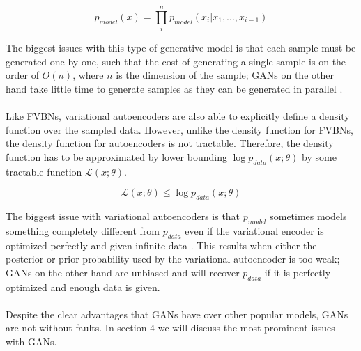 $$p_{model}(x) = \prod_i^np_{model}(x_i|x_1,...,x_{i-1})$$

The biggest issues with this type of generative model is that each sample must be generated one by one, such that the cost of generating a single sample is on the order of $O(n)$, where $n$ is the dimension of the sample; GANs on the other hand take little time to generate samples as they can be generated in parallel \cite{oord2016wavenet}. \\ \\
Like FVBNs, variational autoencoders are also able to explicitly define a density function over the sampled data. However, unlike the density function for FVBNs, the density function for autoencoders is not tractable. Therefore, the density function has to be approximated by lower bounding $\log p_{data}(x;\theta)$ by some tractable function $\mathcal{L}(x; \theta)$.

$$\mathcal{L}(x; \theta) \leq \log p_{data}(x;\theta)$$

The biggest issue with variational autoencoders is that $p_{model}$ sometimes models something completely different from $p_{data}$ even if the variational encoder is optimized perfectly and given infinite data \cite{rezende2014stochastic}. This results when either the posterior or prior probability used by the  variational autoencoder is too weak; GANs on the other hand are unbiased and will recover $p_{data}$ if it is perfectly optimized and enough data is given. \\ \\
Despite the clear advantages that GANs have over other popular models, GANs are not without faults. In section 4 we will discuss the most prominent issues with GANs.
